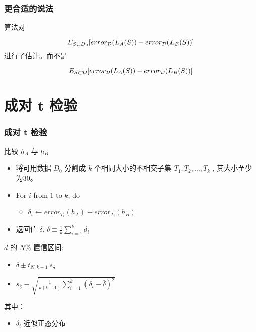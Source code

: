 \documentclass{beamer}
\begin{document}
\begin{frame}
\frametitle{更合适的说法}
\label{sec-6-4}


算法对

\[ E_{S \subset D_{0}}[ error_{\cal{D}}(L_{A}(S)) - error_{\cal{D}}(L_{B}(S))] \]
进行了估计。而不是 

\[ E_{S \subset \cal{D}}[ error_{\cal{D}}(L_{A}(S)) - error_{\cal{D}}(L_{B}(S))] \]
\end{frame}
\section{成对 t 检验}
\label{sec-7}
\begin{frame}
\frametitle{成对 t 检验}
\label{sec-7-1}


比较 $h_{A}$ 与 $h_{B}$
\begin{itemize}
\item 将可用数据 $D_{0}$ 分割成 $k$ 个相同大小的不相交子集 $T_{1}, T_{2},\ldots, T_{k}$ , 其大小至少为30。
\item For $i$ from 1 to $k$, do
\begin{itemize}
\item $\delta_{i} \leftarrow error_{T_{i}}(h_{A}) - error_{T_{i}}(h_{B})$
\end{itemize}
\item 返回值 $\bar{\delta}$, $\bar{\delta} \equiv \frac{1}{k}\sum_{i=1}^{k} \delta_{i}$
\end{itemize}

$d$ 的 $N\%$ 置信区间:
\begin{itemize}
\item $\bar{\delta} \pm t_{N,k-1} \ s_{\bar{\delta}}$
\item $s_{\bar{\delta}} \equiv \sqrt{\frac{1}{k(k-1)} \sum_{i=1}^{k}(\delta_{i} -\bar{\delta})^{2}}$
\end{itemize}

其中：
\begin{itemize}
\item $\delta_{i}$ 近似正态分布
\end{itemize}
\end{frame}
\end{document}
